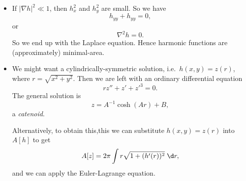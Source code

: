 \documentclass[a4paper]{article}
\begin{document}
\begin{eg}
\begin{itemize}
    \item If $|\nabla h|^2 \ll 1$, then $h_x^2$ and $h_y^2$ are small. So we have
      \[
        h_{yy} + h_{yy} = 0,
      \]
      or
      \[
        \nabla^2 h = 0.
      \]
      So we end up with the Laplace equation. Hence harmonic functions are (approximately) minimal-area.
    \item We might want a cylindrically-symmetric solution, i.e.\ $h(x, y) = z(r)$, where $r = \sqrt{x^2 + y^2}$. Then we are left with an ordinary differential equation
      \[
        rz'' + z' + z'^3 = 0.
      \]
      The general solution is
      \[
        z = A^{-1}\cosh (Ar) + B,
      \]
      a \emph{catenoid}.

      Alternatively, to obtain this,this we can substitute $h(x, y) = z(r)$ into $A[h]$ to get
      \[
        A[z] = 2\pi \int r\sqrt{1 + (h'(r))^2}\;\d r,
      \]
      and we can apply the Euler-Lagrange equation.
  \end{itemize}
\end{eg}
\end{document}
